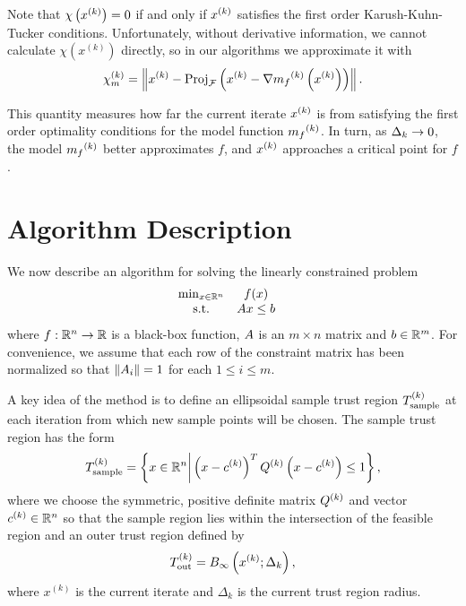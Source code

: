 \documentclass{article}
\begin{document}
Note that $\chi\left(x^{(k)}\right) = 0$ if and only if $x^{(k)}$ satisfies the first order Karush-Kuhn-Tucker conditions.
Unfortunately,  without derivative information, we cannot calculate $\chi(x^{(k)})$ directly,
so in our algorithms we approximate it with
\begin{align}
\label{define_model_criticality_measure}
{\chi_m^{(k)}} = \left\|x^{(k)} - {\textrm{Proj}}_{{\mathcal F}}\left(x^{(k)}- \nabla {{m}_f}^{(k)}\left(x^{(k)}\right)\right)\right\|.
\end{align}

This quantity measures how far the current iterate $x^{(k)}$ is from satisfying the first order optimality conditions for the model function ${{m}_f}^{(k)}$.
In turn, as $\Delta_k \to 0$, the model ${{m}_f}^{(k)}$ better approximates $f$,  and $x^{(k)}$ approaches a critical point for $f$.









\section{Algorithm Description}
\label{sec:linear}
We now describe an algorithm for solving the linearly constrained problem
\begin{align}
\label{eq:DFO-linear}
\begin{array}{ccl} \min_{x \in \mathbb R^n} & f(x) \\
\textrm{s.t.} & {A} x \le {b} & 
\end{array}
\end{align}
where $f:\mathbb R^n\rightarrow\mathbb R$ is a black-box function, 
${A}$ is an $m \times n$ matrix and ${b} \in \mathbb R^m$.
For convenience, we assume that each row of the constraint matrix has been normalized so that
$\left\|{A}_i\right\| = 1$ for each $1 \le i \le m$.


A key idea of the method is to define an ellipsoidal sample trust region ${T_{\text{sample}}^{(k)}}$ at each iteration from which new sample points will be chosen.   The sample trust region has the form
\begin{equation}
\label{define_the_sample_region}
{T_{\text{sample}}^{(k)}} = \left\{x \in \mathbb R^n \bigg | \left(x - c^{(k)}\right)^T {Q^{(k)}} \left(x - c^{(k)}\right) \le 1 \right\},
\end{equation}
where we choose the symmetric, positive definite matrix ${Q^{(k)}}$ and vector $c^{(k)} \in \mathbb R^n$ so that
the sample region lies within the intersection of the feasible region and an outer trust region defined by
\begin{equation}
\label{define_outer_trust_region}
{T_{\text{out}}^{(k)}} = B_{\infty}\left(x^{(k)};\Delta_k\right),
\end{equation}
where $x^{(k)}$ is the current iterate and $\Delta_k$ is the current trust region radius.
\end{document}
